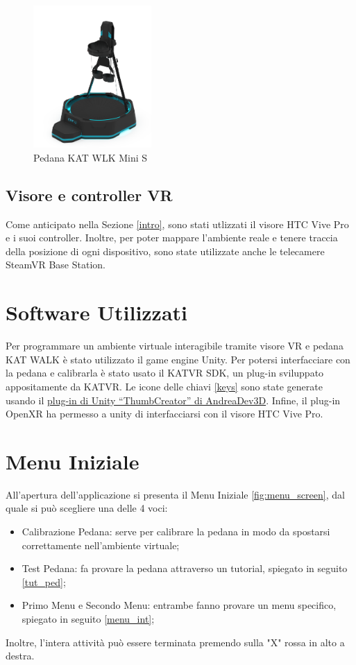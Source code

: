 \documentclass[target=bach,aauheader=]{thud}
\begin{document}
\begin{figure}[h]
    \centering
    \includegraphics[width=0.40\textwidth]{kat_walk_mini}
    \caption{Pedana KAT WLK Mini S}
    \label{fig:kat_walk}
\end{figure}

\subsection{Visore e controller VR}
Come anticipato nella Sezione \ref{intro}, sono stati utlizzati il visore HTC Vive Pro e i suoi controller.
Inoltre, per poter mappare l'ambiente reale e tenere traccia della posizione di ogni dispositivo, sono state utilizzate anche le telecamere SteamVR Base Station.

\section{Software Utilizzati}
Per programmare un ambiente virtuale interagibile tramite visore VR e pedana KAT WALK è stato utilizzato il game engine Unity.
Per potersi interfacciare con la pedana e calibrarla è stato usato il KATVR SDK, un plug-in sviluppato appositamente da KATVR.
Le icone delle chiavi \ref{keys} sono state generate usando il \href{https://github.com/AndreaDev3D/ThumbCreator}{plug-in di Unity “ThumbCreator” di AndreaDev3D}.
Infine, il plug-in OpenXR ha permesso a unity di interfacciarsi con il visore HTC Vive Pro.

\section{Menu Iniziale}
\label{menu_init}
All'apertura dell'applicazione si presenta il Menu Iniziale \ref{fig:menu_screen}, dal quale si può scegliere una delle 4 voci:
\begin{itemize}
    \item Calibrazione Pedana: serve per calibrare la pedana in modo da spostarsi correttamente nell'ambiente virtuale;
    \item Test Pedana: fa provare la pedana attraverso un tutorial, spiegato in seguito \ref{tut_ped};
    \item Primo Menu e Secondo Menu: entrambe fanno provare un menu specifico, spiegato in seguito \ref{menu_int};
\end{itemize} 
Inoltre, l'intera attività può essere terminata premendo sulla "X" rossa in alto a destra.
\end{document}

